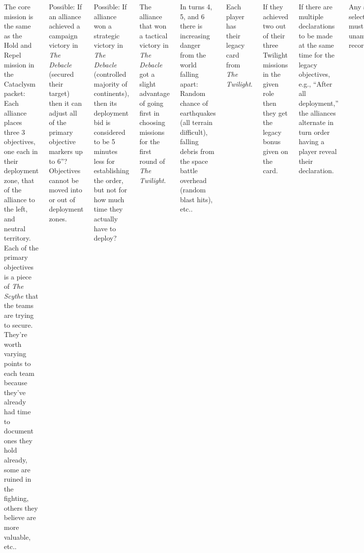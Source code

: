 \clearpage
{}

\begin{columns}


The core mission is the same as the Hold and Repel mission in the
Cataclysm packet: Each alliance places three 3 objectives, one each in
their deployment zone, that of the alliance to the left, and neutral
territory.  Each of the primary objectives is a piece of \emph{The
  Scythe} that the teams are trying to secure.  They're worth varying
points to each team because they've already had time to document ones
they hold already, some are ruined in the fighting, others they
believe are more valuable, etc..


Possible: If an alliance achieved a campaign victory in \emph{The
  Debacle} (secured their target) then it can adjust all of the
primary objective markers up to 6''?  Objectives cannot be moved into
or out of deployment zones.

Possible: If alliance won a strategic victory in \emph{The Debacle}
(controlled majority of continents), then its deployment bid is
considered to be 5 minutes less for establishing the order, but not
for how much time they actually have to deploy?

The alliance that won a tactical victory in \emph{The Debacle} got a
slight advantage of going first in choosing missions for the first
round of \emph{The Twilight}.


In turns 4, 5, and 6 there is increasing danger from the world falling
apart: Random chance of earthquakes (all terrain difficult), falling
debris from the space battle overhead (random blast hits), etc..



Each player has their legacy card from \emph{The Twilight}.

If they achieved two out of their three Twilight missions in the given
role then they get the legacy bonus given on the card.

If there are multiple declarations to be made at the same time for the
legacy objectives, e.g., ``After all deployment,'' the alliances
alternate in turn order having a player reveal their declaration.

Any secret selections must be unambiguously recorded.

Players must have a model still in the game to claim their Cataclysm
objective.


Campaign results for the alliances are based on control of the primary
objectives (pieces of \emph{The Scythe}).

Individual scores are the sum of victory points from the four Recon
Squad missions (48 total), some points if their alliance wins the
Cataclysm, some points if they achieved their Twilight missions, and a
bunch of points if they achieved their personel Cataclysm objective
(12 points total).

\end{columns}
